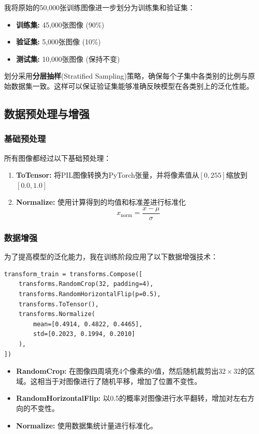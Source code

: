 \documentclass[12pt,a4paper]{article}
\begin{document}
我将原始的50,000张训练图像进一步划分为训练集和验证集：
\begin{itemize}[leftmargin=2em]
    \item \textbf{训练集:} 45,000张图像 (90\%)
    \item \textbf{验证集:} 5,000张图像 (10\%)
    \item \textbf{测试集:} 10,000张图像 (保持不变)
\end{itemize}

划分采用\textbf{分层抽样}(Stratified Sampling)策略，确保每个子集中各类别的比例与原始数据集一致。这样可以保证验证集能够准确反映模型在各类别上的泛化性能。

\subsection{数据预处理与增强}

\subsubsection{基础预处理}

所有图像都经过以下基础预处理：
\begin{enumerate}[leftmargin=2em]
    \item \textbf{ToTensor:} 将PIL图像转换为PyTorch张量，并将像素值从$[0, 255]$缩放到$[0.0, 1.0]$
    \item \textbf{Normalize:} 使用计算得到的均值和标准差进行标准化
    \begin{equation}
        x_{\text{norm}} = \frac{x - \mu}{\sigma}
    \end{equation}
\end{enumerate}

\subsubsection{数据增强}

为了提高模型的泛化能力，我在训练阶段应用了以下数据增强技术：

\begin{lstlisting}[caption={数据增强配置},label={lst:augmentation}]
transform_train = transforms.Compose([
    transforms.RandomCrop(32, padding=4),
    transforms.RandomHorizontalFlip(p=0.5),
    transforms.ToTensor(),
    transforms.Normalize(
        mean=[0.4914, 0.4822, 0.4465],
        std=[0.2023, 0.1994, 0.2010]
    ),
])
\end{lstlisting}

\begin{itemize}[leftmargin=2em]
    \item \textbf{RandomCrop:} 在图像四周填充4个像素的0值，然后随机裁剪出$32 \times 32$的区域。这相当于对图像进行了随机平移，增加了位置不变性。
    \item \textbf{RandomHorizontalFlip:} 以0.5的概率对图像进行水平翻转，增加对左右方向的不变性。
    \item \textbf{Normalize:} 使用数据集统计量进行标准化。
\end{itemize}
\end{document}
